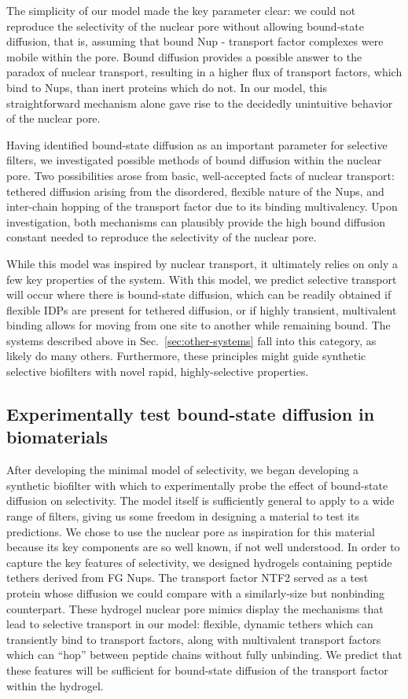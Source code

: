 The simplicity of our model made the key parameter clear: we could not reproduce the selectivity of the nuclear pore without allowing bound-state diffusion, that is, assuming that bound Nup - transport factor complexes were mobile within the pore.  Bound diffusion provides a possible answer to the paradox of nuclear transport, resulting in a higher flux of transport factors, which bind to Nups, than inert proteins which do not.  In our model, this straightforward mechanism alone gave rise to the decidedly unintuitive behavior of the nuclear pore.

Having identified bound-state diffusion as an important parameter for selective filters, we investigated possible methods of bound diffusion within the nuclear pore.  Two possibilities arose from basic, well-accepted facts of nuclear transport: tethered diffusion arising from the disordered, flexible nature of the Nups, and inter-chain hopping of the transport factor due to its binding multivalency.  Upon investigation, both mechanisms can plausibly provide the high bound diffusion constant needed to reproduce the selectivity of the nuclear pore.

While this model was inspired by nuclear transport, it ultimately relies on only a few key properties of the system.  With this model, we predict selective transport will occur where there is bound-state diffusion, which can be readily obtained if flexible IDPs are present for tethered diffusion, or if highly transient, multivalent binding allows for moving from one site to another while remaining bound.  The systems described above in Sec.~\ref{sec:other-systems} fall into this category, as likely do many others.  Furthermore, these principles might guide synthetic selective biofilters with novel rapid, highly-selective properties.

\subsection{Experimentally test bound-state diffusion in biomaterials}

After developing the minimal model of selectivity, we began developing a synthetic biofilter with which to experimentally probe the effect of bound-state diffusion  on selectivity.  The model itself is sufficiently general to apply to a wide range of filters, giving us some freedom in designing a material to test its predictions.  We chose to use the nuclear pore as inspiration for this material because its key components are so well known, if not well understood.  In order to capture the key features of selectivity, we designed hydrogels containing peptide tethers derived from FG Nups.  The transport factor NTF2 served as a test protein whose diffusion we could compare with a similarly-size but nonbinding counterpart.  These hydrogel nuclear pore mimics display the mechanisms that lead to selective transport in our model: flexible, dynamic tethers which can transiently bind to transport factors, along with multivalent transport factors which can ``hop'' between peptide chains without fully unbinding.  We predict that these features will be sufficient for bound-state diffusion of the transport factor within the hydrogel.

